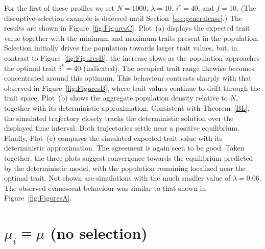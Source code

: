 \documentclass[12pt]{article}
\begin{document}
For the first of these profiles we set $N=1000$, $\lambda=10$,
$i^*=40$, and $f=10$. (The disruptive-selection example is deferred
until Section~\ref{sec:generalcase}.) The results are shown in
Figure~\ref{fig:FiguresC}.
Plot~(a) displays the expected trait value together with the minimum and
maximum traits present in the population. Selection initially drives the
population towards larger trait values, but, in contrast to
Figure~\ref{fig:FiguresB}, the increase slows as the population
approaches the optimal trait $i^*=40$ (indicated). 
The occupied trait range likewise
becomes concentrated around this optimum.
This behaviour contrasts sharply with that observed in
Figure~\ref{fig:FiguresB}, where trait values continue to drift through
the trait space.
Plot~(b) shows the aggregate population density relative to $N$,
together with its deterministic approximation. 
Consistent with Theorem~\ref{BL}, the simulated trajectory closely
tracks the deterministic solution over the displayed time interval. Both
trajectories settle near a positive equilibrium.
Finally, Plot~(c) compares the simulated expected trait value with its
deterministic approximation. The agreement is again seen to be good.
Taken together, the three plots suggest convergence towards the
equilibrium predicted by the deterministic model, with the population
remaining localized near the optimal trait.
Not shown are simulations with the much smaller value of $\lambda=0.06$. 
The observed evanescent behaviour was similar to that shown in
Figure~\ref{fig:FiguresA}.

\section{$\mu_i\equiv\mu$ (no selection)}
\label{sec:noselection}
\end{document}

